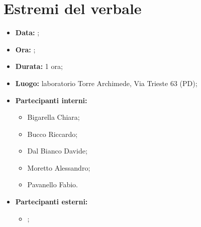 
\section{Estremi del verbale}
\begin{itemize}
	\item \textbf{Data:} ;
	\item \textbf{Ora:} ;
	\item \textbf{Durata:} 1 ora;
	\item \textbf{Luogo:} laboratorio Torre Archimede, Via Trieste 63 (PD);
	\item \textbf{Partecipanti interni:}
	\begin{itemize}
		\item Bigarella Chiara;
		\item Bucco Riccardo;
		\item Dal Bianco Davide;
		\item Moretto Alessandro;
		\item Pavanello Fabio.
	\end{itemize}
	\item \textbf{Partecipanti esterni:}
	\begin{itemize}
		\item \proponente;
	\end{itemize}
\end{itemize}
\newpage
